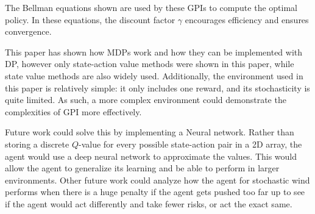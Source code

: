 \documentclass[sigconf,nonacm]{acmart}
\begin{document}
The Bellman equations shown are used by these GPIs to compute the optimal policy. In these equations, the discount factor $\gamma$ encourages efficiency and ensures convergence. 

This paper has shown how MDPs work and how they can be implemented with DP, however only state-action value methods were shown in this paper, while state value methods are also widely used. Additionally, the environment used in this paper is relatively simple: it only includes one reward, and its stochasticity is quite limited. As such, a more complex environment could demonstrate the complexities of GPI more effectively. 

Future work could solve this by implementing a Neural network. Rather than storing a discrete $Q$-value for every possible state-action pair in a 2D array, the agent would use a deep neural network to approximate the values. This would allow the agent to generalize its learning and be able to perform in larger environments. Other future work could analyze how the agent for stochastic wind performs when there is a huge penalty if the agent gets pushed too far up to see if the agent would act differently and take fewer risks, or act the exact same.

\newpage

\balance


\end{document}
